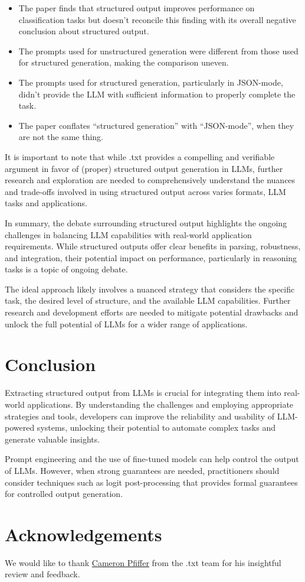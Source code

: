 \begin{itemize}
    \item The paper finds that structured output improves performance on classification tasks but doesn't reconcile this finding with its overall negative conclusion about structured output.
    \item The prompts used for unstructured generation were different from those used for structured generation, making the comparison uneven.
    \item The prompts used for structured generation, particularly in JSON-mode, didn't provide the LLM with sufficient information to properly complete the task.
    \item The paper conflates ``structured generation'' with ``JSON-mode'', when they are not the same thing.
\end{itemize}

It is important to note that while .txt provides a compelling and verifiable argument in favor of (proper) structured output generation in LLMs, further research and exploration are needed to comprehensively understand the nuances and trade-offs involved in using structured output across varies formats, LLM tasks and applications.

In summary, the debate surrounding structured output highlights the ongoing challenges in balancing LLM capabilities with real-world application requirements. While structured outputs offer clear benefits in parsing, robustness, and integration, their potential impact on performance, particularly in reasoning tasks is a topic of ongoing debate.

The ideal approach likely involves a nuanced strategy that considers the specific task, the desired level of structure, and the available LLM capabilities. Further research and development efforts are needed to mitigate potential drawbacks and unlock the full potential of LLMs for a wider range of applications.

\section{Conclusion}

Extracting structured output from LLMs is crucial for integrating them into real-world applications. By understanding the challenges and employing appropriate strategies and tools, developers can improve the reliability and usability of LLM-powered systems, unlocking their potential to automate complex tasks and generate valuable insights.

Prompt engineering and the use of fine-tuned models can help control the output of LLMs. However, when strong guarantees are needed, practitioners should consider techniques such as logit post-processing that provides formal guarantees for controlled output generation.

\section{Acknowledgements}

We would like to thank \href{https://x.com/cameron_pfiffer}{Cameron Pfiffer} from the .txt team for his insightful review and feedback.

